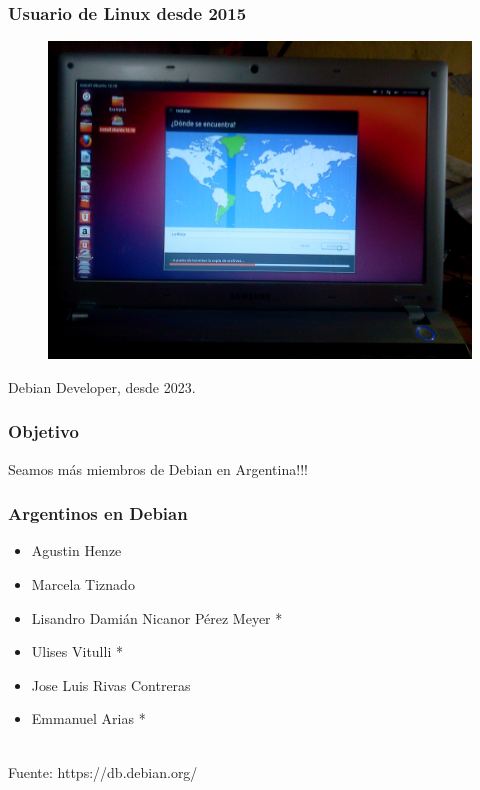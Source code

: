 \documentclass{beamer}
\begin{document}
\begin{frame}
  \frametitle {Usuario de Linux desde 2015}
	\begin{figure}
		\centering
		\includegraphics[width=1\linewidth]{images/ubuntu.jpg}
		\label{fig:Ubuntu}
	\end{figure}
\end{frame}

\begin{frame}
  \centering
    \Huge Debian Developer, desde 2023.
\end{frame}

\begin{frame}
  \frametitle {Objetivo}
  \centering
    \Huge Seamos más miembros de Debian en Argentina!!!
\end{frame}

\begin{frame}
    \frametitle {Argentinos en Debian}
    \begin{itemize}
    	\item Agustin Henze
    	\item Marcela Tiznado
    	\item Lisandro Damián Nicanor Pérez Meyer *
    	\item Ulises Vitulli *
    	\item Jose Luis Rivas Contreras
    	\item Emmanuel Arias *
    \end{itemize}

    \vspace{1cm} \\
    \tiny Fuente: https://db.debian.org/
\end{frame}
\end{document}
